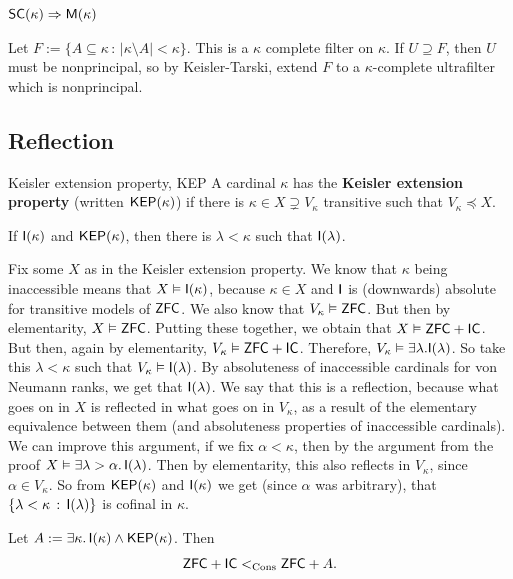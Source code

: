 \documentclass{article}
\begin{document}
\begin{corr}{}
    $\mathsf{SC}(\kappa) \Rightarrow \mathsf{M}(\kappa)$
\end{corr}
\proof Let $F := \{ A \subseteq \kappa\, : \, |\kappa \setminus A| < \kappa\}$. This is a $\kappa$ complete filter on $\kappa$. If $U \supseteq F$, then $U$ must be nonprincipal, so by Keisler-Tarski, extend $F$ to a $\kappa$-complete ultrafilter which is nonprincipal. \endproof 

\newlec

\subsection{Reflection}
\begin{fancydefine}{Keisler extension property, KEP}
    A cardinal $\kappa$ has the \textbf{Keisler extension property} (written $\mathsf{KEP}(\kappa)$) if there is $\kappa \in X \supsetneq V_{\kappa}$ transitive such that $V_{\kappa} \preceq X$.
\end{fancydefine}
\begin{fancyprop}{}
    If $\mathsf{I}(\kappa)$ and $\mathsf{KEP}(\kappa)$, then there is $\lambda < \kappa$ such that $\mathsf{I}(\lambda)$.
\end{fancyprop}
\proof Fix some $X$ as in the Keisler extension property. We know that $\kappa$ being inaccessible means that $X \vDash \mathsf{I}(\kappa)$, because $\kappa \in X$ and $\mathsf{I}$ is (downwards) absolute for transitive models of $\mathsf{ZFC}$. We also know that $V_{\kappa} \vDash \mathsf{ZFC}$. But then by elementarity, $X \vDash \mathsf{ZFC}$.\gap 
Putting these together, we obtain that $X \vDash \mathsf{ZFC} + \mathsf{IC}$. But then, again by elementarity, $V_{\kappa} \vDash \mathsf{ZFC} + \mathsf{IC}$. Therefore, $V_{\kappa} \vDash \exists \lambda. \mathsf{I}(\lambda)$. So take this $\lambda < \kappa$ such that $V_{\kappa} \vDash \mathsf{I}(\lambda)$. By absoluteness of inaccessible cardinals for von Neumann ranks, we get that $\mathsf{I}(\lambda)$. \endproof
We say that this is a reflection, because what goes on in $X$ is reflected in what goes on in $V_{\kappa}$, as a result of the elementary equivalence between them (and absoluteness properties of inaccessible cardinals). \gap 
We can improve this argument, if we fix $\alpha< \kappa$, then by the argument from the proof $X \vDash \exists \lambda > \alpha. \, \mathsf{I}(\lambda)$. Then by elementarity, this also reflects in $V_{\kappa}$, since $\alpha \in V_{\kappa}$. So from $\mathsf{KEP}(\kappa)$ and $\mathsf{I}(\kappa)$ we get (since $\alpha$ was arbitrary), that $\{\lambda < \kappa \, : \, \mathsf{I}(\lambda)\}$ is cofinal in $\kappa$.
\begin{corr}{}
    Let $A:= \exists \kappa. \, \mathsf{I}(\kappa) \wedge \mathsf{KEP}(\kappa)$. Then \[ \mathsf{ZFC} + \mathsf{IC} <_{\operatorname{Cons}} \mathsf{ZFC} + A.\]
\end{corr}
\end{document}
